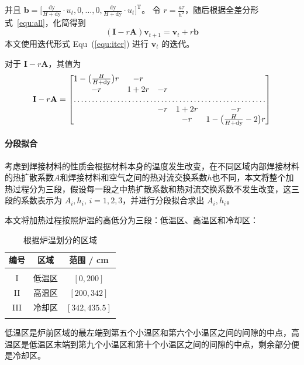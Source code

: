 \documentclass[../main.tex]{subfiles}
\begin{document}
并且 \(\mathbf{b} = \displaystyle \bigg[ \frac{\mathrm{dy}}{H + \mathrm{dy}} \cdot u_{t} , 0 ,\dots, 0 , \frac{\mathrm{dy}}{H + \mathrm{dy}} \cdot u_{t} \bigg] ^{\mathrm{T}}\)。
令 \(r = \displaystyle \frac{a \tau}{h ^{2}}\)，随后根据全差分形式~\ref{equ:all}，化简得到
\begin{equation}\label{equ:iter}
(\mathbf{I} - r\mathbf{A} ) \mathbf{v} _{t+1} = \mathbf{v}_{t} + r \mathbf{b}
\end{equation}
本文使用迭代形式 Equ~(\ref{equ:iter}) 进行 \(\mathbf{v}_{t}\) 的迭代。

对于 \(\mathbf{I} - r \mathbf{A}\)，其值为
\begin{equation}
\mathbf{I} - r \mathbf{A} =
\begin{bmatrix}
1 - \big(\frac{H}{H + \mathrm{dy}}\big) r & -r \\
-r & 1 + 2r & -r \\
\hdotsfor{5}\\
&&-r & 1 + 2r & -r \\
&&& -r & 1 - \big(\frac{H}{H + \mathrm{dy}}- 2\big)r
\end{bmatrix}
\end{equation}

\paragraph{分段拟合} 考虑到焊接材料的性质会根据材料本身的温度发生改变，在不同区域内部焊接材料的热扩散系数\(A\)和焊接材料和空气之间的热对流交换系数\(h\)也不同，本文将整个加热过程分为三段，假设每一段之中热扩散系数和热对流交换系数不发生改变，这三段的系数表示为 \(A_{i}, h_{i}\), \(i = 1 , 2 ,3 \)，并进行分段拟合求出 \(A_{i} ,h_{i}\)。

本文将加热过程按照炉温的高低分为三段：低温区、高温区和冷却区：
\begin{table}[H]
\centering
\begin{tabular}{ccc}
编号&区域 & 范围 / cm \\ \hline \hline
\\ [-1em]
I&低温区& \([0 , 200]\) \\
II&高温区& \([200, 342]\) \\
III&冷却区& \([342, 435.5]\) 
\\ [-1em]
\\ \hline
\end{tabular}\caption{根据炉温划分的区域}
\end{table}
低温区是炉前区域的最左端到第五个小温区和第六个小温区之间的间隙的中点，高温区是低温区末端到第九个小温区和第十个小温区之间的间隙的中点，剩余部分便是冷却区。
\end{document}
